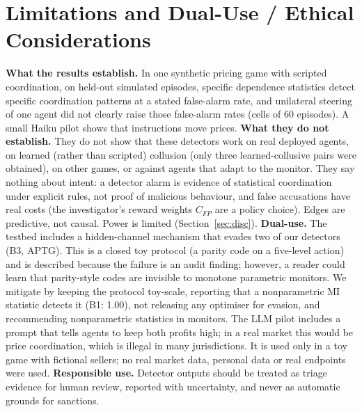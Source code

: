 \documentclass[11pt]{article}
\begin{document}
\section{Limitations and Dual-Use / Ethical Considerations}\label{app:ethics}
\textbf{What the results establish.} In one synthetic pricing game with scripted coordination, on held-out simulated episodes, specific dependence statistics detect specific coordination patterns at a stated false-alarm rate, and unilateral steering of one agent did not clearly raise those false-alarm rates (cells of 60 episodes). A small Haiku pilot shows that instructions move prices.
\textbf{What they do not establish.} They do not show that these detectors work on real deployed agents, on learned (rather than scripted) collusion (only three learned-collusive pairs were obtained), on other games, or against agents that adapt to the monitor. They say nothing about intent: a detector alarm is evidence of statistical coordination under explicit rules, not proof of malicious behaviour, and false accusations have real costs (the investigator's reward weights $C_{FP}$ are a policy choice). Edges are predictive, not causal. Power is limited (Section~\ref{sec:disc}).
\textbf{Dual-use.} The testbed includes a hidden-channel mechanism that evades two of our detectors (B3, APTG). This is a closed toy protocol (a parity code on a five-level action) and is described because the failure is an audit finding; however, a reader could learn that parity-style codes are invisible to monotone parametric monitors. We mitigate by keeping the protocol toy-scale, reporting that a nonparametric MI statistic detects it (B1: 1.00), not releasing any optimiser for evasion, and recommending nonparametric statistics in monitors. The LLM pilot includes a prompt that tells agents to keep both profits high; in a real market this would be price coordination, which is illegal in many jurisdictions. It is used only in a toy game with fictional sellers; no real market data, personal data or real endpoints were used.
\textbf{Responsible use.} Detector outputs should be treated as triage evidence for human review, reported with uncertainty, and never as automatic grounds for sanctions.
\end{document}
